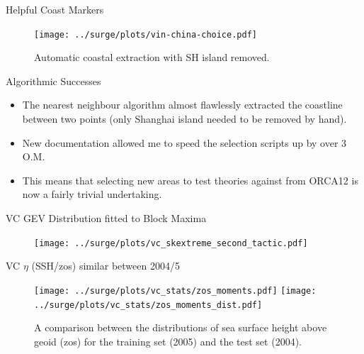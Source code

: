 \begin{frame}{Helpful Coast Markers}
\vspace{-20pt}
 \begin{minipage}{1.0\textwidth}
\begin{figure}[htb!]
    \centering
    \texttt{[image: ../surge/plots/vin-china-choice.pdf]}
    \vspace{-15pt}
   \caption{Automatic coastal extraction with SH island removed. }
\end{figure}
\end{minipage}
\end{frame}


\begin{frame}{Algorithmic Successes}
\vspace{-20pt}
 \begin{itemize}
\item The nearest neighbour algorithm almost flawlessly extracted the coastline
     between two points (only Shanghai island needed to be removed by hand).
\item New documentation allowed me to speed the selection scripts up by over 3 O.M.
\item This means that selecting new areas to test theories against from ORCA12
      is now a fairly trivial undertaking.
\end{itemize}
\end{frame}

\begin{frame}{VC GEV Distribution fitted to Block Maxima}
\vspace{-20pt}
\begin{figure}
\texttt{[image: ../surge/plots/vc\_skextreme\_second\_tactic.pdf]}
\caption{\cite{skextremes} }
\end{figure}
\end{frame}


\begin{frame}{VC $\eta$ (SSH/zos) similar between 2004/5 }
\vspace{-20pt}
\begin{figure}[htb!]
    \centering
    \texttt{[image: ../surge/plots/vc\_stats/zos\_moments.pdf]}
       \hspace{0pt} \texttt{[image: ../surge/plots/vc\_stats/zos\_moments\_dist.pdf]}
    \vspace{-7pt}
    \caption{A comparison between the distributions of sea surface height
     above geoid (zos) for the training set (2005) and the test set (2004).}
\end{figure}
\end{frame}



